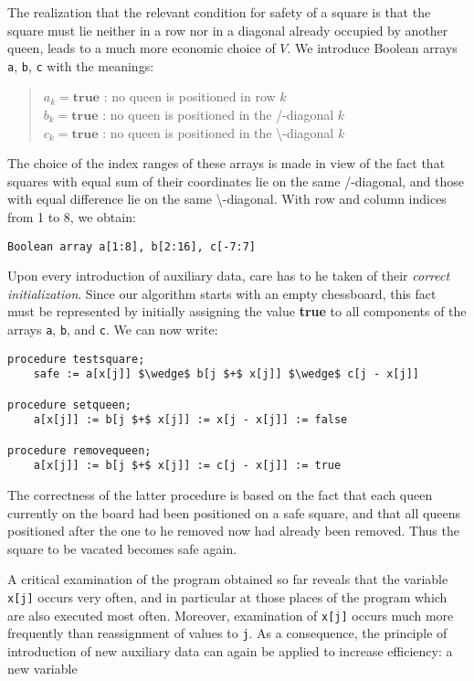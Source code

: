 The realization that the relevant condition for safety of a square is that the
square must lie neither in a row nor in a diagonal already occupied by another
queen, leads to a much more economic choice of $V$.  We introduce Boolean
arrays \verb|a|, \verb|b|, \verb|c| with the meanings:

\begin{quote}
$a_k = \textbf{true}$ : no queen is positioned in row $k$\\
$b_k = \textbf{true}$ : no queen is positioned in the /-diagonal $k$\\
$c_k = \textbf{true}$ : no queen is positioned in the \textbackslash-diagonal $k$\\
\end{quote}

The choice of the index ranges of these arrays is made in view of the fact that
squares with equal sum of their coordinates lie on the same /-diagonal, and
those with equal difference lie on the same \textbackslash-diagonal.  With row
and column indices from 1 to 8, we obtain:

\begin{lstlisting}
Boolean array a[1:8], b[2:16], c[-7:7]
\end{lstlisting}

Upon every introduction of auxiliary data, care has to he taken of their
\emph{correct initialization}.  Since our algorithm starts with an empty
chessboard, this fact must be represented by initially assigning the value
\textbf{true} to all components of the arrays \verb|a|, \verb|b|, and \verb|c|.
We can now write:

\begin{lstlisting}
procedure testsquare;
    safe := a[x[j]] $\wedge$ b[j $+$ x[j]] $\wedge$ c[j - x[j]]

procedure setqueen;
    a[x[j]] := b[j $+$ x[j]] := x[j - x[j]] := false

procedure removequeen;
    a[x[j]] := b[j $+$ x[j]] := c[j - x[j]] := true
\end{lstlisting}

The correctness of the latter procedure is based on the fact that each queen
currently on the board had been positioned on a safe square, and that all
queens positioned after the one to he removed now had already been removed.
Thus the square to be vacated becomes safe again.

A critical examination of the program obtained so far reveals that the variable
\verb|x[j]| occurs very often, and in particular at those places of the program
which are also executed most often.  Moreover, examination of \verb|x[j]|
occurs much more frequently than reassignment of values to \verb|j|.  As a
consequence, the principle of introduction of new auxiliary data can again be
applied to increase efficiency: a new variable

